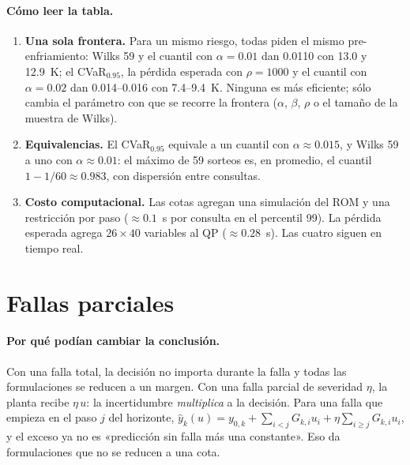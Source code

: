 \paragraph{Cómo leer la tabla.}
\begin{enumerate}
  \item \textbf{Una sola frontera.} Para un mismo riesgo, todas piden el mismo pre-enfriamiento:
        Wilks 59 y el cuantil con $\alpha=0.01$ dan 0.0110 con 13.0 y 12.9~K; el CVaR$_{0.95}$, la
        pérdida esperada con $\rho=1000$ y el cuantil con $\alpha=0.02$ dan 0.014--0.016 con
        7.4--9.4~K. Ninguna es más eficiente; sólo cambia el parámetro con que se recorre la
        frontera ($\alpha$, $\beta$, $\rho$ o el tamaño de la muestra de Wilks).
  \item \textbf{Equivalencias.} El CVaR$_{0.95}$ equivale a un cuantil con $\alpha\approx0.015$, y
        Wilks 59 a uno con $\alpha\approx0.01$: el máximo de 59 sorteos es, en promedio, el
        cuantil $1-1/60\approx0.983$, con dispersión entre consultas.
  \item \textbf{Costo computacional.} Las cotas agregan una simulación del ROM y una restricción
        por paso ($\approx0.1$~s por consulta en el percentil 99). La pérdida esperada agrega
        $26\times40$ variables al QP ($\approx0.28$~s). Las cuatro siguen en tiempo real.
\end{enumerate}


\section{Fallas parciales}\label{sec:riesgo-parciales}
\paragraph{Por qué podían cambiar la conclusión.} Con una falla total, la decisión no importa
durante la falla y todas las formulaciones se reducen a un margen. Con una falla parcial de
severidad $\eta$, la planta recibe $\eta\,u$: la incertidumbre \emph{multiplica} a la decisión.
Para una falla que empieza en el paso $j$ del horizonte,
$\hat y_k(u)=y_{0,k}+\sum_{i<j}G_{k,i}u_i+\eta\sum_{i\ge j}G_{k,i}u_i$, y el exceso ya no es
«predicción sin falla más una constante». Eso da formulaciones que no se reducen a una cota.

